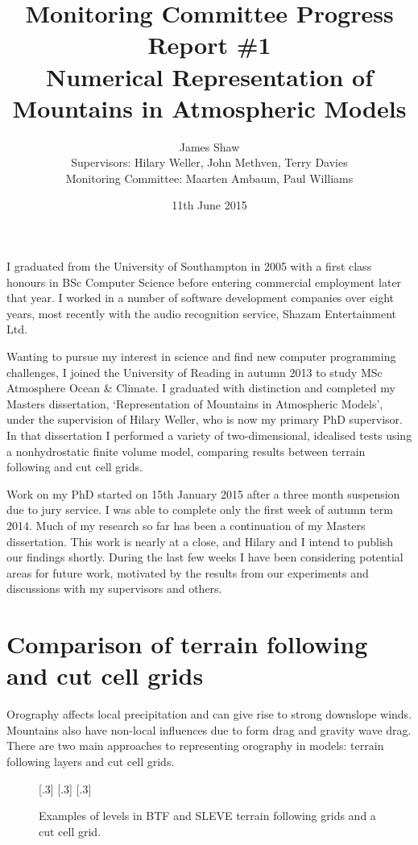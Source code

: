 \documentclass[a4paper]{article}
\title{Monitoring Committee Progress Report \#1\\
\vspace*{1em}
\Large{Numerical Representation of Mountains in Atmospheric Models}}
\author{James Shaw
\vspace{0.5em} \\
\large{Supervisors: Hilary Weller, John Methven, Terry Davies}
\vspace{0.5em} \\
\large{Monitoring Committee: Maarten Ambaum, Paul Williams}}
\date{11th June 2015}
\begin{document}
\newcommand{\exner}{\Pi}
\newcommand{\TODO}[1]{\textcolor{purple}{TODO: \emph{#1}}}
\maketitle

I graduated from the University of Southampton in 2005 with a first class honours in BSc Computer Science before entering commercial employment later that year.  I worked in a number of software development companies over eight years, most recently with the audio recognition service, Shazam Entertainment Ltd.

Wanting to pursue my interest in science and find new computer programming challenges, I joined the University of Reading in autumn 2013 to study MSc Atmosphere Ocean \& Climate.  I graduated with distinction and completed my Masters dissertation, `Representation of Mountains in Atmospheric Models', under the supervision of Hilary Weller, who is now my primary PhD supervisor.  In that dissertation I performed a variety of two-dimensional, idealised tests using a nonhydrostatic finite volume model, comparing results between terrain following and cut cell grids.

Work on my PhD started on 15th January 2015 after a three month suspension due to jury service.  I was able to complete only the first week of autumn term 2014.
Much of my research so far has been a continuation of my Masters dissertation.  This work is nearly at a close, and Hilary and I intend to publish our findings shortly.  During the last few weeks I have been considering potential areas for future work, motivated by the results from our experiments and discussions with my supervisors and others.

\section{Comparison of terrain following and cut cell grids}
Orography affects local precipitation and can give rise to strong downslope winds.  Mountains also have non-local influences due to form drag and gravity wave drag.  There are two main approaches to representing orography in models: terrain following layers and cut cell grids.

\begin{figure}
	\centering
	[.3\linewidth]{}
	[.3\linewidth]{}
	[.3\linewidth]{}
%
	\caption{Examples of levels in BTF and SLEVE terrain following grids and a cut cell grid.}
	\label{fig:grids}
\end{figure}
\end{document}
